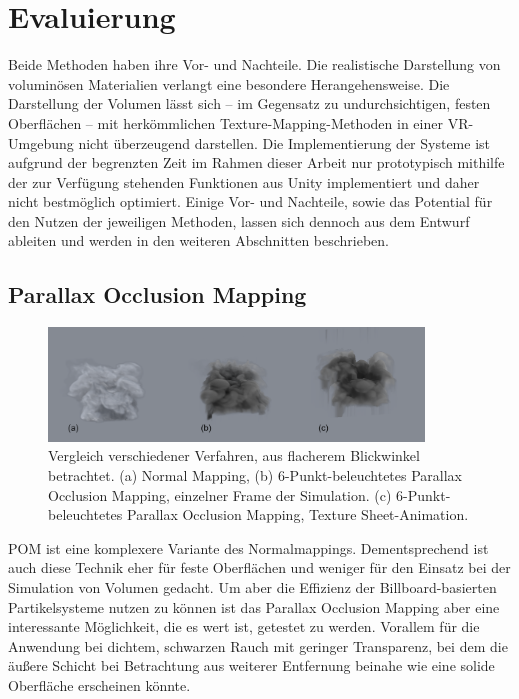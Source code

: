 \newpage
\section{Evaluierung }
\label{sec:5}

Beide Methoden haben ihre Vor- und Nachteile. Die realistische Darstellung von voluminösen Materialien verlangt
eine besondere Herangehensweise. Die Darstellung der Volumen lässt sich – im Gegensatz zu undurchsichtigen, festen Oberflächen – 
mit herkömmlichen Texture-Mapping-Methoden in einer VR-Umgebung nicht überzeugend darstellen.
Die Implementierung der Systeme ist aufgrund der begrenzten Zeit im Rahmen dieser Arbeit nur prototypisch mithilfe der
zur Verfügung stehenden Funktionen aus Unity implementiert und daher nicht bestmöglich optimiert.
Einige Vor- und Nachteile, sowie das Potential für den Nutzen der jeweiligen Methoden, lassen sich dennoch aus dem Entwurf
ableiten und werden in den weiteren Abschnitten beschrieben.


\subsection{Parallax Occlusion Mapping}
\label{sec:5.1}
\begin{figure}[!h]
	\centering
	\includegraphics[width=0.89\textwidth]{Grafiken/Implementation/pom_Vergleich.png}
	\begin{footnotesize}
		\caption{Vergleich verschiedener Verfahren, aus flacherem Blickwinkel betrachtet. 
		(a) Normal Mapping, (b) 6-Punkt-beleuchtetes Parallax Occlusion Mapping, einzelner Frame der Simulation. (c) 6-Punkt-beleuchtetes Parallax Occlusion Mapping, Texture Sheet-Animation. }
		\label{fig:pomVergleich}
	\end{footnotesize}
\end{figure}

POM ist eine komplexere Variante des Normalmappings. Dementsprechend ist auch diese Technik eher für feste Oberflächen und weniger
für den Einsatz bei der Simulation von Volumen gedacht. Um aber die Effizienz der Billboard-basierten Partikelsysteme
nutzen zu können ist das Parallax Occlusion Mapping aber eine interessante Möglichkeit, die es wert ist, getestet zu werden. 
Vorallem für die Anwendung bei dichtem, schwarzen Rauch mit geringer Transparenz, bei dem die äußere Schicht bei Betrachtung aus weiterer 
Entfernung beinahe wie eine solide Oberfläche erscheinen könnte. 

